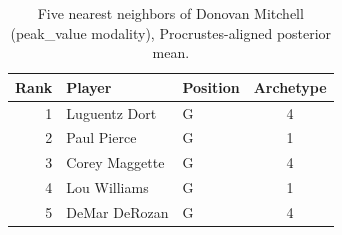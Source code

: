 \begin{table}[htbp]
  \centering\small
  \begin{tabular}{rllc}
    \toprule
    Rank & Player & Position & Archetype \\
    \midrule
    1 & Luguentz Dort & G & 4 \\
    2 & Paul Pierce & G & 1 \\
    3 & Corey Maggette & G & 4 \\
    4 & Lou Williams & G & 1 \\
    5 & DeMar DeRozan & G & 4 \\
    \bottomrule
  \end{tabular}
  \caption{Five nearest neighbors of Donovan Mitchell (peak_value modality), Procrustes-aligned posterior mean.}
  \label{tab:Donovan_Mitchell_neighbors_peak_value}
\end{table}

